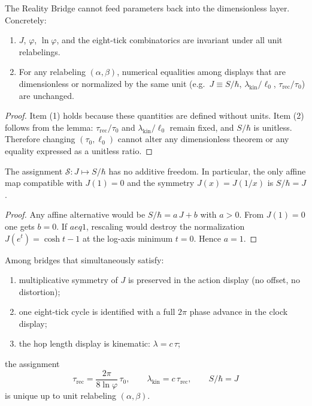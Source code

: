 \documentclass[11pt]{article}
\theoremstyle{plain}
\theoremstyle{definition}
\theoremstyle{remark}
\begin{document}
\begin{theorem}
The Reality Bridge cannot feed parameters back into the dimensionless layer. Concretely:
\begin{enumerate}
\item \(J\), \(\varphi\), \(\ln\varphi\), and the eight-tick combinatorics are invariant under all unit relabelings.
\item For any relabeling \((\alpha,\beta)\), numerical equalities among displays that are dimensionless or normalized by the same unit (e.g.\ \(J\equiv S/\hbar\), \(\lambda_{\mathrm{kin}}/\ell_{0}\), \(\tau_{\mathrm{rec}}/\tau_{0}\)) are unchanged.
\end{enumerate}
\end{theorem}

\begin{proof}
Item (1) holds because these quantities are defined without units. Item (2) follows from the lemma: \(\tau_{\mathrm{rec}}/\tau_{0}\) and \(\lambda_{\mathrm{kin}}/\ell_{0}\) remain fixed, and \(S/\hbar\) is unitless. Therefore changing \((\tau_{0},\ell_{0})\) cannot alter any dimensionless theorem or any equality expressed as a unitless ratio.
\end{proof}

\begin{proposition}
The assignment \(\mathcal{S}:J\mapsto S/\hbar\) has no additive freedom. In particular, the only affine map compatible with \(J(1)=0\) and the symmetry \(J(x)=J(1/x)\) is \(S/\hbar=J\).
\end{proposition}

\begin{proof}
Any affine alternative would be \(S/\hbar=a\,J+b\) with \(a>0\). From \(J(1)=0\) one gets \(b=0\). If \(a
eq 1\), rescaling would destroy the normalization \(J(e^{t})=\cosh t-1\) at the log-axis minimum \(t=0\). Hence \(a=1\).
\end{proof}

\begin{proposition}
Among bridges that simultaneously satisfy:
\begin{enumerate}
\item multiplicative symmetry of \(J\) is preserved in the action display (no offset, no distortion);
\item one eight-tick cycle is identified with a full \(2\pi\) phase advance in the clock display;
\item the hop length display is kinematic: \(\lambda = c\,\tau\);
\end{enumerate}
the assignment
\[
\tau_{\mathrm{rec}}=\frac{2\pi}{8\ln\varphi}\,\tau_{0},\qquad
\lambda_{\mathrm{kin}}=c\,\tau_{\mathrm{rec}},\qquad
S/\hbar=J
\]
is unique up to unit relabeling \((\alpha,\beta)\).
\end{proposition}
\end{document}

